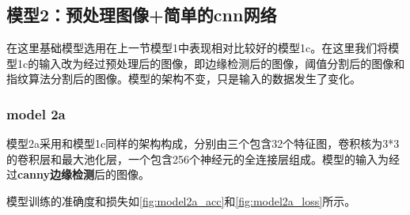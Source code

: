 \FloatBarrier
\subsection{模型2：预处理图像+简单的cnn网络}

在这里基础模型选用在上一节模型1中表现相对比较好的模型1c。在这里我们将模型1c的输入改为经过预处理后的图像，即边缘检测后的图像，阈值分割后的图像和指纹算法分割后的图像。模型的架构不变，只是输入的数据发生了变化。

\subsubsection{model 2a}

模型2a采用和模型1c同样的架构构成，分别由三个包含32个特征图，卷积核为3*3的卷积层和最大池化层，一个包含256个神经元的全连接层组成。模型的输入为经过\textbf{canny边缘检测}后的图像。

模型训练的准确度和损失如\autoref{fig:model2a_acc}和\autoref{fig:model2a_loss}所示。

